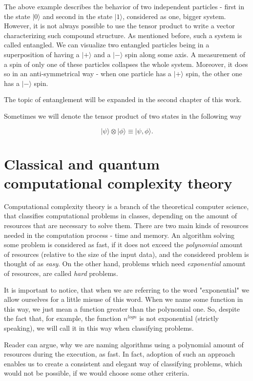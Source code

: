 The above example describes the behavior of two independent particles - first in the state $|0\rangle$ and second in the state $|1\rangle$, considered as one, bigger system. However, it is not always possible to use the tensor product to write a vector characterizing such compound structure. As mentioned before, such a system is called entangled. We can visualize two entangled particles being in a superposition of having a $|+\rangle$ and  a $|-\rangle$ spin along some axis. A measurement of a spin of only one of these particles collapses the whole system. Moreover, it does so in an anti-symmetrical way - when one particle has a $|+\rangle$ spin, the other one has a $|-\rangle$ spin.

The topic of entanglement will be expanded in the second chapter of this work.

\begin{remark}
Sometimes we will denote the tensor product of two states in the following way

\[ |\psi \rangle \otimes |\phi \rangle \equiv |\psi , \phi \rangle. \]
\end{remark}


\newpage
\section{Classical and quantum computational complexity theory}

Computational complexity theory is a branch of the theoretical computer science, that classifies computational problems in classes, depending on the amount of resources that are necessary to solve them. There are two main kinds of resources needed in the computation process - time and memory. An algorithm solving some problem is considered as fast, if it does not exceed the \textit{polynomial} amount of resources (relative to the size of the input data), and the considered problem is thought of as \textit{easy}. On the other hand, problems which need \textit{exponential} amount of resources, are called \textit{hard} problems. 

It is important to notice, that when we are referring to the word "exponential" we allow ourselves for a little misuse of this word. When we name some function in this way, we just mean a function greater than the polynomial one. So, despite the fact that, for example, the function $n^{logn}$ is not exponential (strictly speaking), we will call it in this way when classifying problems.

Reader can argue, why we are naming algorithms using a polynomial amount of resources during the execution, as fast. In fact, adoption of such an approach enables us to create a consistent and elegant way of classifying problems, which would not be possible, if we would choose some other criteria.

